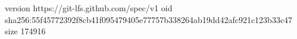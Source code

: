 version https://git-lfs.github.com/spec/v1
oid sha256:55f45772392f8cb41f095479405e77757b338264ab19dd42afc921c123b33c47
size 174916

